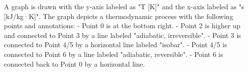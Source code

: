 A graph is drawn with the y-axis labeled as "T [K]" and the x-axis labeled as "s [kJ/kg·K]". The graph depicts a thermodynamic process with the following points and annotations:  
- Point 0 is at the bottom right.  
- Point 2 is higher up and connected to Point 3 by a line labeled "adiabatic, irreversible".  
- Point 3 is connected to Point 4/5 by a horizontal line labeled "isobar".  
- Point 4/5 is connected to Point 6 by a line labeled "adiabatic, reversible".  
- Point 6 is connected back to Point 0 by a horizontal line.